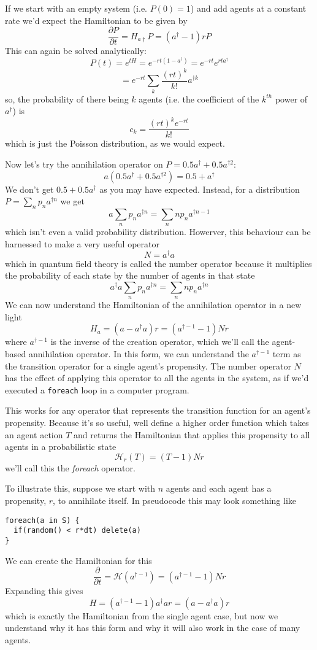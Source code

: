 \documentclass[letterpaper,twocolumn,10pt]{article}
\begin{document}
If we start with an empty system (i.e. $P(0) = 1$) and add agents at a constant rate we'd expect the Hamiltonian to be given by
\[
\frac{\partial P}{\partial t} = H_{a\dag}P = (a^\dag - 1)rP
\]
This can again be solved analytically:
\[
P(t) = e^{tH} = e^{-rt(1-a^\dag)} = e^{-rt}e^{rta^\dag}
\]
\[
= e^{-rt}\sum_k \frac{(rt)^k}{k!}a^{\dag k}
\]
so, the probability of there being $k$ agents (i.e. the coefficient of the $k^{th}$ power of $a^\dag$) is 
\[
c_k = \frac{(rt)^ke^{-rt}}{k!}
\]
which is just the Poisson distribution, as we would expect.

Now let's try the annihilation operator on $P = 0.5a^\dag + 0.5a^{\dag 2}$:
\[
a (0.5a^\dag + 0.5a^{\dag 2}) = 0.5 + a^\dag
\]
We don't get $0.5 + 0.5a^\dag$ as you may have expected. Instead, for a distribution $P = \sum_n p_na^{\dag n}$ we get
\[
a \sum_n p_na^{\dag n} = \sum_n n p_n a^{\dag n-1}
\]
which isn't even a valid probability distribution. Howerver, this behaviour can be harnessed to make a very useful operator
\[
N = a^\dag a
\]
which in quantum field theory is called the number operator because it multiplies the probability of each state by the number of agents in that state
\[
a^\dag a \sum_n p_na^{\dag n} = \sum_n n p_n a^{\dag n}
\]
We can now understand the Hamiltonian of the annihilation operator in a new light
\[
H_a = (a - a^\dag a)r = (a^{\dag -1} - 1)Nr
\]
where $a^{\dag -1}$ is the inverse of the creation operator, which we'll call the agent-based annihilation operator. In this form, we can understand the $a^{\dag -1}$ term as the transition operator for a single agent's propensity. The number operator $N$ has the effect of applying this operator to all the agents in the system, as if we'd executed a \texttt{foreach} loop in a computer program.

This works for any operator that represents the transition function for an agent's propensity. Because it's so useful, well define a higher order function which takes an agent action $T$ and returns the Hamiltonian that applies this propensity to all agents in a probabilistic state
\[
\mathcal{H}_r(T) = (T - 1)Nr
\]
we'll call this the \textit{foreach} operator.

To illustrate this, suppose we start with $n$ agents and each agent has a propensity, $r$, to annihilate itself. In pseudocode this may look something like
\begin{verbatim}
foreach(a in S) {
  if(random() < r*dt) delete(a)
}
\end{verbatim}

We can create the Hamiltonian for this
\[
\frac{\partial}{\partial t} = \mathcal{H}(a^{\dag -1}) = (a^{\dag-1} - 1)Nr
\]
Expanding this gives
\[
H = (a^{\dag-1} - 1)a^\dag ar = (a - a^\dag a)r
\]
which is exactly the Hamiltonian from the single agent case, but now we understand why it has this form and why it will also work in the case of many agents.
\end{document}
